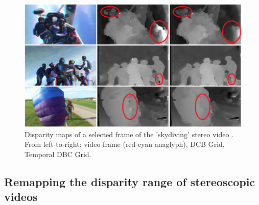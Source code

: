 \begin{figure}[h!]
  \centering
  \includegraphics[width=1.0\textwidth]{src/images/dbcgrid.png}
  \caption[Examples of disparity maps]{Disparity maps of a selected frame of the 'skydiving' stereo video \citep{richardt2010real}. From left-to-right: video frame (red-cyan anaglyph), DCB Grid, Temporal DBC Grid.}
  \label{fig:dbcgrid}
\end{figure}

\subsection{Remapping the disparity range of stereoscopic videos}

